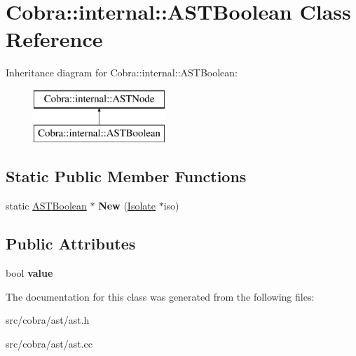 \hypertarget{class_cobra_1_1internal_1_1_a_s_t_boolean}{\section{Cobra\+:\+:internal\+:\+:A\+S\+T\+Boolean Class Reference}
\label{class_cobra_1_1internal_1_1_a_s_t_boolean}
}
Inheritance diagram for Cobra\+:\+:internal\+:\+:A\+S\+T\+Boolean\+:\begin{figure}[H]
\begin{center}
\leavevmode
\includegraphics[height=2.000000cm]{class_cobra_1_1internal_1_1_a_s_t_boolean}
\end{center}
\end{figure}
\subsection*{Static Public Member Functions}
\begin{DoxyCompactItemize}
\item 
\hypertarget{class_cobra_1_1internal_1_1_a_s_t_boolean_acaf761398c238a6a614f47e1c13fce83}{static \hyperlink{class_cobra_1_1internal_1_1_a_s_t_boolean}{A\+S\+T\+Boolean} $\ast$ {\bfseries New} (\hyperlink{class_cobra_1_1internal_1_1_isolate}{Isolate} $\ast$iso)}\label{class_cobra_1_1internal_1_1_a_s_t_boolean_acaf761398c238a6a614f47e1c13fce83}

\end{DoxyCompactItemize}
\subsection*{Public Attributes}
\begin{DoxyCompactItemize}
\item 
\hypertarget{class_cobra_1_1internal_1_1_a_s_t_boolean_a029bb02b49553aee23445512eb57afa0}{bool {\bfseries value}}\label{class_cobra_1_1internal_1_1_a_s_t_boolean_a029bb02b49553aee23445512eb57afa0}

\end{DoxyCompactItemize}


The documentation for this class was generated from the following files\+:\begin{DoxyCompactItemize}
\item 
src/cobra/ast/ast.\+h\item 
src/cobra/ast/ast.\+cc\end{DoxyCompactItemize}
